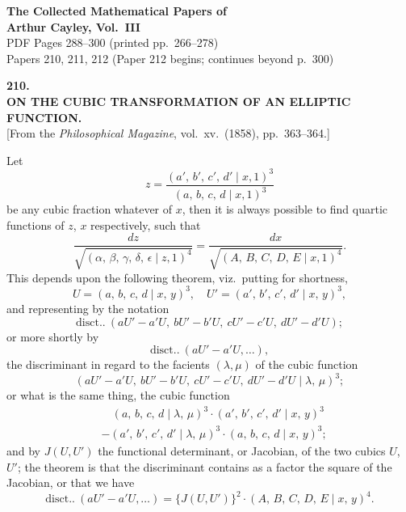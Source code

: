 \documentclass[11pt]{article}
\providecommand{\disct}{\mathrm{disct.}}
\begin{document}
\begin{center}
{\Large\bfseries The Collected Mathematical Papers of\\[0.5em] Arthur Cayley, Vol.\ III}\\[1.5em]
{\large PDF Pages 288--300 (printed pp.\ 266--278)}\\[0.5em]
{\small Papers 210, 211, 212 (Paper 212 begins; continues beyond p.\ 300)}
\end{center}

\vspace{1.5em}


\begin{center}
\textbf{210.}\\[0.5em]
{\large\bfseries ON THE CUBIC TRANSFORMATION OF AN ELLIPTIC FUNCTION.}\\[0.5em]
[From the \textit{Philosophical Magazine}, vol.\ xv.\ (1858), pp.\ 363--364.]
\end{center}

\medskip

\noindent Let
\[
z = \frac{(a',\,b',\,c',\,d' \mid x, 1)^3}{(a,\,b,\,c,\,d \mid x, 1)^3}
\]
be any cubic fraction whatever of $x$, then it is always possible to find quartic functions of $z$, $x$ respectively, such that
\[
\frac{dz}{\sqrt{(\alpha,\,\beta,\,\gamma,\,\delta,\,\epsilon \mid z, 1)^4}} = \frac{dx}{\sqrt{(A,\,B,\,C,\,D,\,E \mid x, 1)^4}}.
\]
This depends upon the following theorem, viz.\ putting for shortness,
\[
U = (a,\,b,\,c,\,d \mid x,\,y)^3, \quad U' = (a',\,b',\,c',\,d' \mid x,\,y)^3,
\]
and representing by the notation
\[
\disct.\ (aU' - a'U,\ bU' - b'U,\ cU' - c'U,\ dU' - d'U);
\]
or more shortly by
\[
\disct.\ (aU' - a'U, \ldots),
\]
the discriminant in regard to the facients $(\lambda,\mu)$ of the cubic function
\[
(aU' - a'U,\ bU' - b'U,\ cU' - c'U,\ dU' - d'U \mid \lambda,\,\mu)^3;
\]
or what is the same thing, the cubic function
\begin{align*}
&\phantom{-\,}(a,\,b,\,c,\,d \mid \lambda,\,\mu)^3 \cdot (a',\,b',\,c',\,d' \mid x,\,y)^3\\
&-(a',\,b',\,c',\,d' \mid \lambda,\,\mu)^3 \cdot (a,\,b,\,c,\,d \mid x,\,y)^3;
\end{align*}
and by $J(U,U')$ the functional determinant, or Jacobian, of the two cubics $U$, $U'$; the theorem is that the discriminant contains as a factor the square of the Jacobian, or that we have
\[
\disct.\ (aU' - a'U, \ldots) = \{J(U,U')\}^2 \cdot (A,\,B,\,C,\,D,\,E \mid x,\,y)^4.
\]
\end{document}
